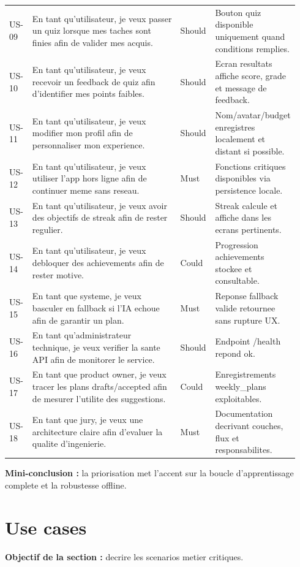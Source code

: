\documentclass[12pt,a4paper]{article}
\begin{document}
\begin{longtable}{p{0.08\linewidth}p{0.52\linewidth}p{0.12\linewidth}p{0.22\linewidth}}
US-09 & En tant qu'utilisateur, je veux passer un quiz lorsque mes taches sont finies afin de valider mes acquis. & Should & Bouton quiz disponible uniquement quand conditions remplies. \\
US-10 & En tant qu'utilisateur, je veux recevoir un feedback de quiz afin d'identifier mes points faibles. & Should & Ecran resultats affiche score, grade et message de feedback. \\
US-11 & En tant qu'utilisateur, je veux modifier mon profil afin de personnaliser mon experience. & Should & Nom/avatar/budget enregistres localement et distant si possible. \\
US-12 & En tant qu'utilisateur, je veux utiliser l'app hors ligne afin de continuer meme sans reseau. & Must & Fonctions critiques disponibles via persistence locale. \\
US-13 & En tant qu'utilisateur, je veux avoir des objectifs de streak afin de rester regulier. & Should & Streak calcule et affiche dans les ecrans pertinents. \\
US-14 & En tant qu'utilisateur, je veux debloquer des achievements afin de rester motive. & Could & Progression achievements stockee et consultable. \\
US-15 & En tant que systeme, je veux basculer en fallback si l'IA echoue afin de garantir un plan. & Must & Reponse fallback valide retournee sans rupture UX. \\
US-16 & En tant qu'administrateur technique, je veux verifier la sante API afin de monitorer le service. & Should & Endpoint /health repond ok. \\
US-17 & En tant que product owner, je veux tracer les plans drafts/accepted afin de mesurer l'utilite des suggestions. & Could & Enregistrements weekly\_plans exploitables. \\
US-18 & En tant que jury, je veux une architecture claire afin d'evaluer la qualite d'ingenierie. & Must & Documentation decrivant couches, flux et responsabilites. \\
\bottomrule
\end{longtable}

\textbf{Mini-conclusion :} la priorisation met l'accent sur la boucle d'apprentissage complete et la robustesse offline.

\section{Use cases}
\textbf{Objectif de la section :} decrire les scenarios metier critiques.
\end{document}
